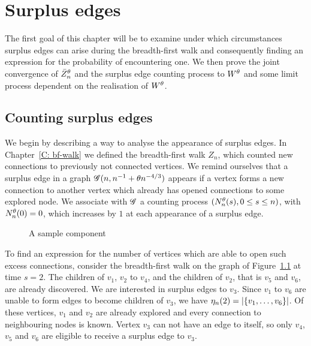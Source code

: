
\chapter{Surplus edges} \label{C: surplus edges}

The first goal of this chapter will be to examine under which circumstances surplus edges can arise during the breadth-first walk 
and consequently finding an expression for the probability of encountering one.
We then prove the joint convergence of $\bar{Z}^{\theta}_n$ and the surplus edge counting process to $W^{\theta}$ and some limit process dependent on the realisation of $W^{\theta}$.


\section{Counting surplus edges}

We begin by describing a way to analyse the appearance of surplus edges.
In Chapter~\ref{C: bf-walk} we defined the breadth-first walk $Z_n$, 
which counted new connections to previously not connected vertices.
We remind ourselves that a surplus edge in a graph $\mathscr{G}(n, n^{-1} + \theta n^{-4/3})$ appears if
a vertex forms a new connection to another vertex
which already has opened connections to some explored node.
We associate with $\mathscr{G}$ a counting process $(N_n^{\theta}(s), 0 \leq s \leq n)$, \label{I: nnt}
with $N_n^{\theta}(0) = 0$, which increases by $1$ at each appearance of a surplus edge.

\begin{figure}[h]
	\centering
	\scalebox{0.85}{
		
	}
	\caption{A sample component} 
	\label{F: Surplus Edges Tree}
\end{figure}

To find an expression for the number of vertices which are able to open such excess connections, 
consider the breadth-first walk on the graph of Figure~\ref{F: Surplus Edges Tree} at time $s=2$.
The children of $v_1$, $v_2$ to $v_4$, and the children of $v_2$, that is $v_5$ and $v_6$, are already discovered.
We are interested in surplus edges to $v_3$.
Since $v_1$ to $v_6$ are unable to form edges to become children of $v_3$, we have $\eta_n(2) = |\{ v_1, \dots,  v_6\}|$.
Of these vertices, $v_1$ and $v_2$ are already explored and every connection to neighbouring nodes is known.
Vertex $v_3$ can not have an edge to itself, so only $v_4$, $v_5$ and $v_6$ are eligible to receive a surplus edge to $v_3$.


